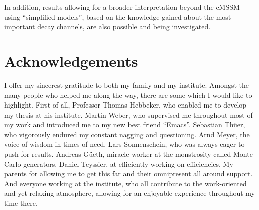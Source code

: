 In addition, results allowing for a broader interpretation beyond the cMSSM using ``simplified models'', based on the knowledge gained about the most important decay channels, are also possible and being investigated.

\section*{Acknowledgements} 
\label{sec:acknowledgements}

I offer my sincerest gratitude to both my family and my institute. Amongst the many people who helped me along the way, there are some which I would like to highlight. First of all, Professor Thomas Hebbeker, who enabled me to develop my thesis at his institute. Martin Weber, who supervised me throughout most of my work and introduced me to my new best friend ``Emacs''. Sebastian Th\"uer, who vigorously endured my constant nagging and questioning. Arnd Meyer, the voice of wisdom in times of need. Lars Sonnenschein, who was always eager to push for results. Andreas G\"ueth, miracle worker at the monstrosity called Monte Carlo generators. Daniel Teyssier, at efficiently working on efficiencies. My parents for allowing me to get this far and their omnipresent all around support. And everyone working at the institute, who all contribute to the work-oriented and yet relaxing atmosphere, allowing for an enjoyable experience throughout my time there.

